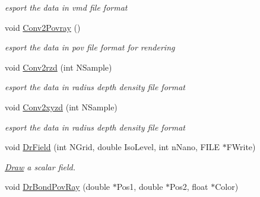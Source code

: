 \begin{DoxyCompactItemize}
\begin{DoxyCompactList}\small\item\em esport the data in vmd file format \end{DoxyCompactList}\item 
\hypertarget{classElPoly_ac2e836951a966bd69b21705cad363b95}{void \hyperlink{classElPoly_ac2e836951a966bd69b21705cad363b95}{\-Conv2\-Povray} ()}\label{classElPoly_ac2e836951a966bd69b21705cad363b95}

\begin{DoxyCompactList}\small\item\em esport the data in pov file format for rendering \end{DoxyCompactList}\item 
\hypertarget{classElPoly_a538747fd3f643c9d171a00a5ec371ccc}{void \hyperlink{classElPoly_a538747fd3f643c9d171a00a5ec371ccc}{\-Conv2rzd} (int \-N\-Sample)}\label{classElPoly_a538747fd3f643c9d171a00a5ec371ccc}

\begin{DoxyCompactList}\small\item\em esport the data in radius depth density file format \end{DoxyCompactList}\item 
\hypertarget{classElPoly_ad9aa947dfbb4fd8d4f2eb314efc17730}{void \hyperlink{classElPoly_ad9aa947dfbb4fd8d4f2eb314efc17730}{\-Conv2xyzd} (int \-N\-Sample)}\label{classElPoly_ad9aa947dfbb4fd8d4f2eb314efc17730}

\begin{DoxyCompactList}\small\item\em esport the data in radius depth density file format \end{DoxyCompactList}\item 
\hypertarget{classElPoly_aee301bfab80a5bff74d1929e63cdbf0f}{void \hyperlink{classElPoly_aee301bfab80a5bff74d1929e63cdbf0f}{\-Dr\-Field} (int \-N\-Grid, double \-Iso\-Level, int n\-Nano, \-F\-I\-L\-E $\ast$\-F\-Write)}\label{classElPoly_aee301bfab80a5bff74d1929e63cdbf0f}

\begin{DoxyCompactList}\small\item\em \hyperlink{classDraw}{\-Draw} a scalar field. \end{DoxyCompactList}\item 
\hypertarget{classElPoly_a1d6d8bfcdb851627bb183cb803353270}{void \hyperlink{classElPoly_a1d6d8bfcdb851627bb183cb803353270}{\-Dr\-Bond\-Pov\-Ray} (double $\ast$\-Pos1, double $\ast$\-Pos2, float $\ast$\-Color)}\label{classElPoly_a1d6d8bfcdb851627bb183cb803353270}


\end{DoxyCompactItemize}
